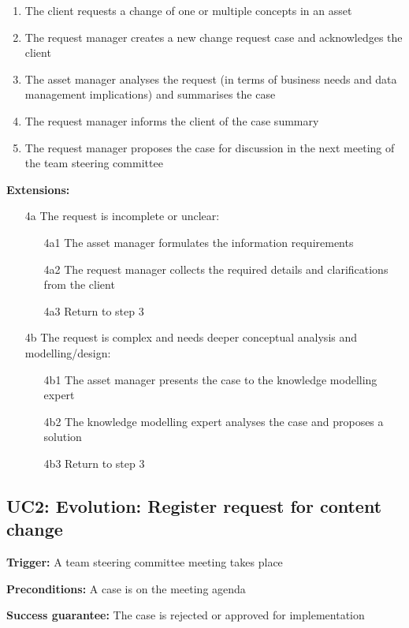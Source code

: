	\begin{enumerate}
		\item The client requests a change of one or multiple concepts in an asset
		\item The request manager creates a new change request case and acknowledges the client
		\item The asset manager analyses the request (in terms of business needs and data management implications) and summarises the case
		\item The request manager informs the client of the case summary
		\item The request manager proposes the case for discussion in the next meeting of the team steering committee		
	\end{enumerate}
	\textbf{Extensions:}
	\begin{enumerate}
		\item [4a] The request is incomplete or unclear:
		\begin{enumerate}
			\item [4a1] The asset manager formulates the information requirements			
			\item [4a2] The request manager collects the required details and clarifications from the client
			\item [4a3] Return to step 3 
		\end{enumerate}
		\item [4b] The request is complex and needs deeper conceptual analysis and modelling/design:
		\begin{enumerate}
			\item [4b1] The asset manager presents the case to the knowledge modelling expert 
			\item [4b2] The knowledge modelling expert analyses the case and proposes a solution
			\item [4b3] Return to step 3			
		\end{enumerate}
	\end{enumerate}
	
	
	\subsection{UC2: Evolution: Register request for content change}
	\label{sec:uc2}
	
	\textbf{Trigger:} A team steering committee meeting takes place 
	
	\textbf{Preconditions:} A case is on the meeting agenda 
	
	\textbf{Success guarantee:} The case is rejected or approved for implementation
	
